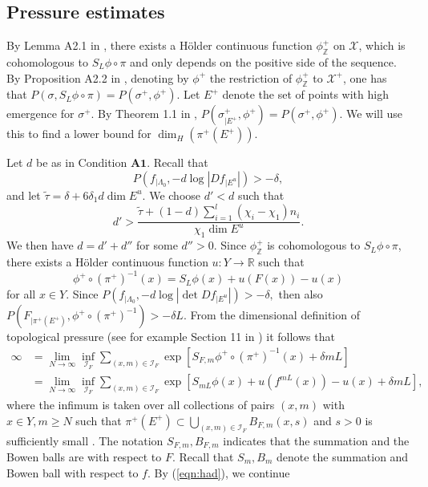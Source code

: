 \documentclass{amsart}
\theoremstyle{plain}
\theoremstyle{definition}
\theoremstyle{remark}
\numberwithin{equation}{section}
\begin{document}
\subsection{Pressure estimates}\label{sec:pressure}
By Lemma A2.1  in \cite{pes97}, there exists a H\"older continuous function $\phi^+_{\mathbb{Z}}$ on $\mathcal{X}$, which is cohomologous to $S_L\phi\circ \pi$ and only depends on the positive side of the sequence.
By Proposition A2.2 in \cite{pes97}, denoting by $\phi^+$ the restriction of $\phi^+_{\mathbb{Z}}$ to $\mathcal{X}^+$, one has that 
$   P(\sigma, S_L\phi\circ \pi) = P(\sigma^+, \phi^+).  $
Let $E^+$ denote the set of points with high emergence for $\sigma^+$.
By Theorem 1.1 in \cite{NakZ}, $ P(\sigma^+_{| E^+}, \phi^+)= P(\sigma^+, \phi^+).$
We will use this to find a lower bound for $\dim_H (\pi^+  (E^+))$.

Let $d$ be as in Condition $\textbf{A1}$. Recall that $$    P(f_{|\Lambda_0},   - d   \log |    Df_{| E^u}| )  >   - \delta   ,$$
and let  $\tilde{\tau}= \delta + 6\delta_1 d \dim E^u. $
We choose $d'< d$ such that
\begin{equation}\label{def:d'}
d'>  \frac{\tilde{\tau} + (1-d)\sum_{i=1}^l(\chi_i -\chi_1) n_i}{\chi_1 \dim E^u}.
\end{equation}
We then have $d = d' + d''$ for some $d'' > 0.$
Since  $\phi^+_{\mathbb{Z}}$ is cohomologous to  $S_L\phi\circ \pi$, there exists a H\"older continuous function $u: Y \to \mathbb{R}$ such that
$$  \phi^+\circ (\pi^+)^{-1}(x) =    S_L\phi(x)  + u(F(x)) - u(x)  $$
for all $x\in Y$. Since $  P(f_{|\Lambda_0},   - d   \log |   \det  Df_{| E^u}| )>-\delta, $ then also \newline$  P(F_{|\pi^+(E^+)},    \phi^+\circ (\pi^+)^{-1}  )  > -\delta L$.
From the dimensional definition of topological pressure (see for example Section 11 in  \cite{pes97}) it follows that
\begin{align*}
\infty & = \lim_{N\to \infty}  \inf_{\mathcal{I}_F}  \sum_{(x,m)\in\mathcal{I}_F} \exp\left[  S_{F,m}     \phi^+\circ (\pi^+)^{-1} (x)    + \delta mL \right]\\
&=    \lim_{N\to \infty}  \inf_{\mathcal{I}_F}  \sum_{(x,m)\in\mathcal{I}_F} \exp\left[  S_{mL}     \phi(x) + u(f^{mL}(x))   - u(x)    + \delta mL \right]        ,  
\end{align*}
where the infimum is taken over all collections of pairs $(x,m)$ with $x\in Y, m\geq N$ such that $\pi^+(E^+) \subset \bigcup_{(x,m)\in\mathcal{I}_F} B_{F,m}(x,s)$ and $s>0$ is sufficiently small . 
The notation $S_{F,m}, B_{F,m}$ indicates that the summation and the Bowen balls are with respect to $F$. Recall that $S_m, B_m$ denote the summation and Bowen ball with respect to $f$.
By (\ref{eqn:had}), we continue
\end{document}
